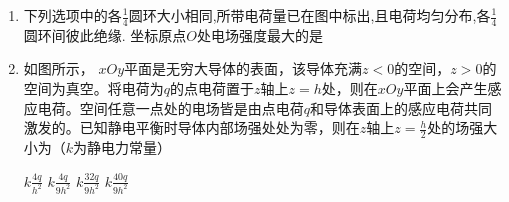 \begin{enumerate}[leftmargin=0em]
\begin{enumerate}
\end{enumerate}
\begin{figure}[h!]
\flushright

\end{figure}












\item
{}
下列选项中的各$ \frac{ 1 }{ 4 } $圆环大小相同,所带电荷量已在图中标出,且电荷均匀分布,各$ \frac{ 1 }{ 4 } $圆环间彼此绝缘. 坐标原点$ O $处电场强度最大的是  
\begin{figure}[h!]
\centering

\end{figure}


\item
{}
如图所示， $ xOy $平面是无穷大导体的表面，该导体充满$ z<0 $的空间，$ z>0 $的空间为真空。将电荷为$ q $的点电荷置于$ z $轴上$ z=h $处，则在$ xOy $平面上会产生感应电荷。空间任意一点处的电场皆是由点电荷$ q $和导体表面上的感应电荷共同激发的。已知静电平衡时导体内部场强处处为零，则在$ z $轴上$ z=\frac{h}{2} $处的场强大小为（$ k $为静电力常量）  

\begin{minipage}[h!]{0.7\linewidth}
\vspace{0.3em}
\fourchoices
{$k \frac { 4 q } { h ^ { 2 } }$}
{$k \frac { 4 q } { 9 h ^ { 2 } }$}
{$k \frac { 32 q } { 9 h ^ { 2 } }$}
{$k \frac { 40 q } { 9 h ^ { 2 } }$}
\vspace{0.3em}
\end{minipage}
\hfill
\begin{minipage}[h!]{0.3\linewidth}
\flushright
\vspace{0.3em}

\vspace{0.3em}
\end{minipage}






\end{enumerate}
